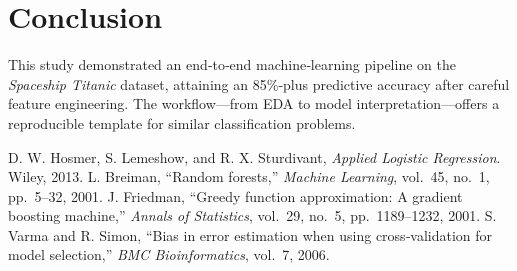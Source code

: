 \documentclass[12pt]{article}
\begin{document}
\section{Conclusion}
This study demonstrated an end‑to‑end machine‑learning pipeline on the \emph{Spaceship Titanic} dataset, attaining an 85\%‑plus predictive accuracy after careful feature engineering.  The workflow—from EDA to model interpretation—offers a reproducible template for similar classification problems.

\begin{thebibliography}{9}
 D. W. Hosmer, S. Lemeshow, and R. X. Sturdivant, \emph{Applied Logistic Regression}. Wiley, 2013.
 L. Breiman, “Random forests,” \emph{Machine Learning}, vol. 45, no. 1, pp. 5–32, 2001.
 J. Friedman, “Greedy function approximation: A gradient boosting machine,” \emph{Annals of Statistics}, vol. 29, no. 5, pp. 1189–1232, 2001.
 S. Varma and R. Simon, “Bias in error estimation when using cross‑validation for model selection,” \emph{BMC Bioinformatics}, vol. 7, 2006.
\end{thebibliography}
\end{document}
